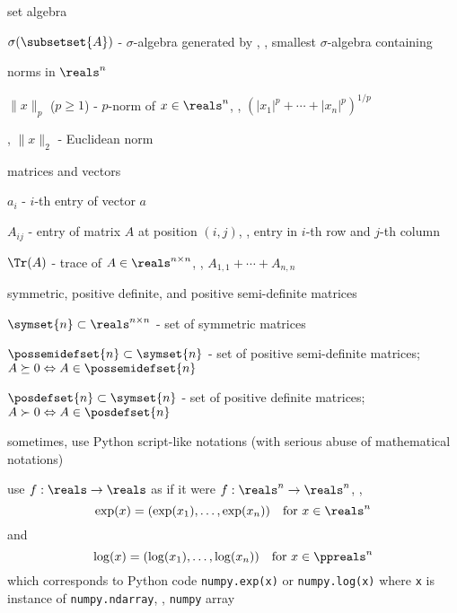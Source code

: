 \documentclass[17pt,landscape]{foils}
\begin{document}
{\item
	set algebra
	\bit
	\item
		$\sigma()$ - $\sigma$-algebra generated by \subsetset{A},
			\ie, smallest $\sigma$-algebra containing %
	\eit

\item
	norms in $\reals^n$%
	\bit
	\item
		$\|x\|_p$ ($p\geq1$) - $p$-norm of $x\in\reals^n$, \ie, $(|x_1|^p + \cdots + |x_n|^p)^{1/p}$
	\item
		\eg, $\|x\|_2$ - Euclidean norm
	\eit
%

\item
	matrices and vectors
	\bit
	\item $a_{i}$ - $i$-th entry of vector $a$
	\item $A_{ij}$ - entry of matrix $A$ at position $(i,j)$,
		\ie, entry in $i$-th row and $j$-th column
	\item $\Tr(A)$ - trace of $A \in\reals^{n\times n}$,
		\ie, $A_{1,1}+ \cdots + A_{n,n}$%
	\eit

\item
	symmetric, positive definite, and positive semi-definite matrices
	\bit
	\item
		$\symset{n}\subset \reals^{n\times n}$ - set of symmetric matrices%

	\item
		$\possemidefset{n}\subset \symset{n}$ - set of positive semi-definite matrices;
		$A\succeq0 \Leftrightarrow A \in \possemidefset{n}$%

	\item
		$\posdefset{n}\subset \symset{n}$ - set of positive definite matrices;
		$A\succ0 \Leftrightarrow A \in \posdefset{n}$%
	\eit

\item
	sometimes,
	use Python script-like notations
	(with serious abuse of mathematical notations)
	\bit
	\item
		use $f:\reals\to\reals$ as if it were $f:\reals^n \to \reals^n$,
		\eg,
		$$
			\exp(x) = (\exp(x_1), \ldots, \exp(x_n)) \quad \mbox{for } x\in\reals^n
		$$
		and
		$$
			\log(x) = (\log(x_1), \ldots, \log(x_n)) \quad \mbox{for } x\in\ppreals^n
		$$
		which corresponds to Python code {\tt numpy.exp(x)} or {\tt numpy.log(x)}
		where {\tt x} is instance of {\tt numpy.ndarray}, \ie, {\tt numpy} array

}
\end{document}

